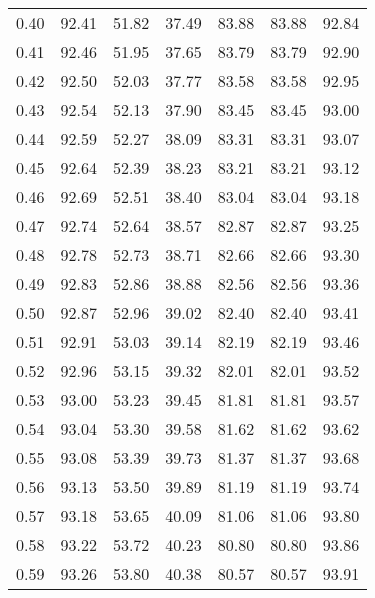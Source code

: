 \begin{tabular}{|c|c|c|c|c|c|c|}
      0.40 &     92.41 &     51.82 &      37.49 &   83.88 &      83.88 &         92.84 \\
      0.41 &     92.46 &     51.95 &      37.65 &   83.79 &      83.79 &         92.90 \\
      0.42 &     92.50 &     52.03 &      37.77 &   83.58 &      83.58 &         92.95 \\
      0.43 &     92.54 &     52.13 &      37.90 &   83.45 &      83.45 &         93.00 \\
      0.44 &     92.59 &     52.27 &      38.09 &   83.31 &      83.31 &         93.07 \\
      0.45 &     92.64 &     52.39 &      38.23 &   83.21 &      83.21 &         93.12 \\
      0.46 &     92.69 &     52.51 &      38.40 &   83.04 &      83.04 &         93.18 \\
      0.47 &     92.74 &     52.64 &      38.57 &   82.87 &      82.87 &         93.25 \\
      0.48 &     92.78 &     52.73 &      38.71 &   82.66 &      82.66 &         93.30 \\
      0.49 &     92.83 &     52.86 &      38.88 &   82.56 &      82.56 &         93.36 \\
      0.50 &     92.87 &     52.96 &      39.02 &   82.40 &      82.40 &         93.41 \\
      0.51 &     92.91 &     53.03 &      39.14 &   82.19 &      82.19 &         93.46 \\
      0.52 &     92.96 &     53.15 &      39.32 &   82.01 &      82.01 &         93.52 \\
      0.53 &     93.00 &     53.23 &      39.45 &   81.81 &      81.81 &         93.57 \\
      0.54 &     93.04 &     53.30 &      39.58 &   81.62 &      81.62 &         93.62 \\
      0.55 &     93.08 &     53.39 &      39.73 &   81.37 &      81.37 &         93.68 \\
      0.56 &     93.13 &     53.50 &      39.89 &   81.19 &      81.19 &         93.74 \\
      0.57 &     93.18 &     53.65 &      40.09 &   81.06 &      81.06 &         93.80 \\
      0.58 &     93.22 &     53.72 &      40.23 &   80.80 &      80.80 &         93.86 \\
      0.59 &     93.26 &     53.80 &      40.38 &   80.57 &      80.57 &         93.91 \\

\end{tabular}
